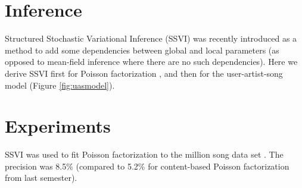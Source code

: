\documentclass[12pt,letterpaper]{article}
\begin{document}
\section{Inference}

Structured Stochastic Variational Inference (SSVI) was recently introduced \parencite{Hoffman2014} as a method to add some dependencies between global and local parameters (as opposed to mean-field inference where there are no such dependencies). Here we derive SSVI first for Poisson factorization \citep{Gopalan2013}, and then for the user-artist-song model (Figure \ref{fig:uasmodel}).

\section{Experiments}

SSVI was used to fit Poisson factorization to the million song data set \citep{Liang2014}. The precision was 8.5\% (compared to 5.2\% for content-based Poisson factorization from last semester).

\printbibliography
\end{document}
